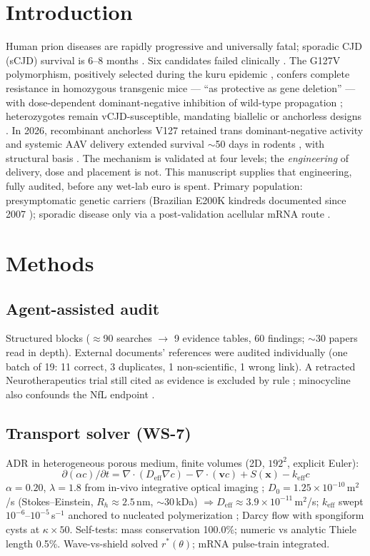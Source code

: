 \documentclass[10pt,twocolumn]{article}
\begin{document}
\section{Introduction}
Human prion diseases are rapidly progressive and universally fatal; sporadic CJD (sCJD) survival is 6--8 months \citep{hermann2021}. Six candidates failed clinically \citep{groveman2021pps,mead2022,cheng2015}. The G127V polymorphism, positively selected during the kuru epidemic \citep{mead2009}, confers complete resistance in homozygous transgenic mice --- ``as protective as gene deletion'' --- with dose-dependent dominant-negative inhibition of wild-type propagation \citep{asante2015}; heterozygotes remain vCJD-susceptible, mandating biallelic or anchorless designs \citep{asante2015}. In 2026, recombinant anchorless V127 retained trans dominant-negative activity \citep{gatdula2026} and systemic AAV delivery extended survival $\sim$50 days in rodents \citep{zerbes2026}, with structural basis \citep{hosszu2020,zheng2018}. The mechanism is validated at four levels; the \emph{engineering} of delivery, dose and placement is not. This manuscript supplies that engineering, fully audited, before any wet-lab euro is spent. Primary population: presymptomatic genetic carriers (Brazilian E200K kindreds documented since 2007 \citep{smid2007}); sporadic disease only via a post-validation acellular mRNA route \citep{xue2025}.

\section{Methods}
\subsection{Agent-assisted audit}
Structured blocks ($\approx$90 searches $\to$ 9 evidence tables, 60 findings; $\sim$30 papers read in depth). External documents' references were audited individually (one batch of 19: 11 correct, 3 duplicates, 1 non-scientific, 1 wrong link). A retracted Neurotherapeutics trial still cited as evidence is excluded by rule \citep{shahretract}; minocycline also confounds the NfL endpoint \citep{gentile2024}.

\subsection{Transport solver (WS-7)}
ADR in heterogeneous porous medium, finite volumes (2D, $192^2$, explicit Euler):
\begin{equation}
\partial(\alpha c)/\partial t=\nabla\!\cdot\!(D_{\text{eff}}\nabla c)-\nabla\!\cdot\!(\mathbf{v}c)+S(\mathbf{x})-k_{\text{eff}}c
\end{equation}
$\alpha=0.20$, $\lambda=1.8$ from in-vivo integrative optical imaging \citep{thorne2006}; $D_0=1.25\times10^{-10}$\,m$^2$/s (Stokes--Einstein, $R_h\approx2.5$\,nm, $\sim$30\,kDa) $\Rightarrow D_{\text{eff}}\approx3.9\times10^{-11}$\,m$^2$/s; $k_{\text{eff}}$ swept $10^{-6}$--$10^{-5}$\,s$^{-1}$ anchored to nucleated polymerization \citep{masel1999}; Darcy flow with spongiform cysts at $\kappa\times50$. Self-tests: mass conservation 100.0\%; numeric vs analytic Thiele length 0.5\%. Wave-vs-shield solved $r^{*}(\theta)$; mRNA pulse-train integrated.
\end{document}
